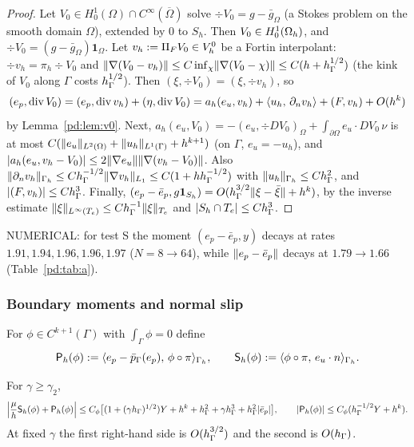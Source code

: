 \begin{proof}
Let $V_0\in H^1_0(\Omega)\cap C^\infty(\overline\Omega)$ solve $\div V_0=g-\bar g_\Omega$ (a Stokes problem on the smooth domain $\Omega$), extended by $0$ to $S_h$. Then $V_0\in H^1_0(\Omega_h)$, and $\div V_0=(g-\bar g_\Omega)\mathbf 1_\Omega$. Let $v_h:=\Pi_FV_0\in V_h^0$ be a Fortin interpolant: $\div v_h=\pi_h\div V_0$ and $\lVert \nabla(V_0-v_h)\rVert\le C\inf_{\chi}\lVert \nabla(V_0-\chi)\rVert\le C(h+h_\Gamma^{1/2})$ (the kink of $V_0$ along $\Gamma$ costs $h_\Gamma^{1/2}$). Then $(\xi,\div V_0)=(\xi,\div v_h)$, so
\[
(e_p,\operatorname{div} V_0)=(e_p,\operatorname{div} v_h)+(\eta,\operatorname{div} V_0)=a_h(e_u,v_h)+\langle u_h,\, \partial_n v_h\rangle+(F,v_h)+O(h^k)
\]
by Lemma~\ref{pd:lem:v0}. Next, $a_h(e_u,V_0)=-(e_u,\div DV_0)_\Omega+\int_{\partial\Omega}e_u\cdot DV_0\,\nu$ is at most $C(\lVert e_u\rVert_{L^2(\Omega)}+\lVert u_h\rVert_{L^1(\Gamma)}+h^{k+1})$ (on $\Gamma$, $e_u=-u_h$), and $|a_h(e_u,v_h-V_0)|\le2\lVert \nabla e_u\rVert\lVert \nabla(v_h-V_0)\rVert$. Also $\lVert \partial_n v_h\rVert_{\Gamma_h}\le Ch_\Gamma^{-1/2}\lVert \nabla v_h\rVert_{L_1}\le C(1+hh_\Gamma^{-1/2})$ with $\lVert u_h\rVert_{\Gamma_h}\le Ch_\Gamma^2$, and $|(F,v_h)|\le Ch_\Gamma^3$. Finally, $(e_p-\bar e_p,g\mathbf 1_{S_h})=O(h_\Gamma^{3/2}\lVert \xi-\bar\xi\rVert+h^k)$, by the inverse estimate $\lVert \xi\rVert_{L^\infty(T_e)}\le Ch_\Gamma^{-1}\lVert \xi\rVert_{T_e}$ and $|S_h\cap T_e|\le Ch_\Gamma^3$.
\end{proof}

NUMERICAL: for test S the moment $(e_p-\bar e_p,y)$ decays at rates $1.91,1.94,1.96,1.96,1.97$ ($N=8\to64$), while $\lVert e_p-\bar e_p\rVert$ decays at $1.79\to1.66$ (Table~\ref{pd:tab:a}).

\subsubsection{Boundary moments and normal slip}

For $\phi\in C^{k+1}(\Gamma)$ with $\int_\Gamma\phi=0$ define
\[
\mathsf P_h(\phi):=\langle e_p-\bar p_{\Gamma}(e_p),\, \phi\circ\pi\rangle_{\Gamma_h},\qquad \mathsf S_h(\phi):=\langle \phi\circ\pi,\, e_u\cdot n\rangle_{\Gamma_h}.
\]

\begin{proposition}\label{pd:prop:B1}
For $\gamma\ge\gamma_2$,
\[
\Bigl|\frac\mu h\mathsf S_h(\phi)+\mathsf P_h(\phi)\Bigr|\le C_\phi\bigl[(1+(\gamma h_\Gamma)^{1/2})Y+h^k+h_\Gamma^2+\gamma h_\Gamma^3+h_\Gamma^2|\bar e_p|\bigr],
\qquad |\mathsf P_h(\phi)|\le C_\phi(h_\Gamma^{-1/2}Y+h^k).
\]
At fixed $\gamma$ the first right-hand side is $O(h_\Gamma^{3/2})$ and the second is $O(h_\Gamma)$.
\end{proposition}

